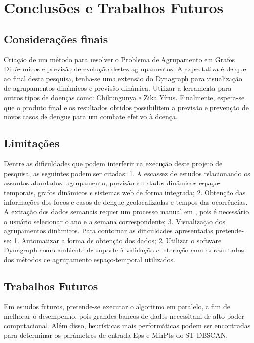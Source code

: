 \chapter{Conclusões e Trabalhos Futuros}
\label{chap:conclusoes-e-trabalhos-futuros}

\section{Considerações finais}
\label{sec:contribuicoes-do-trabalho}

Criação de um método para resolver o Problema de Agrupamento em Grafos Dinâ-
micos e previsão de evolução destes agrupamentos.
A expectativa é de que ao final desta pesquisa, tenha-se uma extensão do Dynagraph
para visualização de agrupamentos dinâmicos e previsão dinâmica.
Utilizar a ferramenta para outros tipos de doenças como: Chikungunya e Zika Vírus.
Finalmente, espera-se que o produto final e os resultados obtidos possibilitem a previsão e
prevenção de novos casos de dengue para um combate efetivo à doença.

\section{Limitações}
\label{sec:limitacoes}

Dentre as dificuldades que podem interferir na execução deste projeto de pesquisa,
as seguintes podem ser citadas:
1. A escassez de estudos relacionando os assuntos abordados: agrupamento, previsão em
dados dinâmicos espaço-temporais, grafos dinâmicos e sistemas web de forma integrada;
2. Obtenção das informações dos focos e casos de dengue geolocalizadas e tempos das
ocorrências. A extração dos dados semanais requer um processo manual em \cite{simda},
pois é necessário o usuário selecionar o ano e a semana correspondente;
3. Visualização dos agrupamentos dinâmicos.
Para contornar as dificuldades apresentadas pretende-se:
1. Automatizar a forma de obtenção dos dados;
2. Utilizar o software Dynagraph como ambiente de suporte à validação e interação com os
resultados dos métodos de agrupamento espaço-temporal utilizados.

\section{Trabalhos Futuros}
\label{sec:trabalhos-futuros}

Em estudos futuros, pretende-se executar o algoritmo em paralelo, a fim de melhorar o desempenho, pois grandes bancos de dados necessitam de alto poder computacional. Além disso, heurísticas mais performáticas podem ser encontradas para determinar os parâmetros de entrada Eps e MinPts do ST-DBSCAN.



